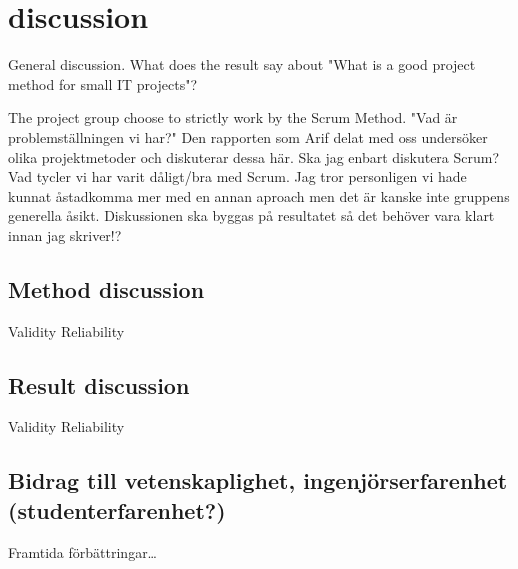 
\section{discussion}
General discussion. What does the result say about "What is a good project method for small IT projects"?

The project group choose to strictly work by the Scrum Method. "Vad är problemställningen vi har?" Den rapporten som Arif delat med oss undersöker olika projektmetoder och diskuterar dessa här. Ska jag enbart diskutera Scrum? Vad tycler vi har varit dåligt/bra med Scrum. Jag tror personligen vi hade kunnat åstadkomma mer med en annan aproach men det är kanske inte gruppens generella åsikt.
Diskussionen ska byggas på resultatet så det behöver vara klart innan jag skriver!? 

\subsection{Method discussion}
Validity
Reliability

\subsection{Result discussion}
Validity
Reliability

\subsection{Bidrag till vetenskaplighet, ingenjörserfarenhet (studenterfarenhet?)}
Framtida förbättringar\dots
